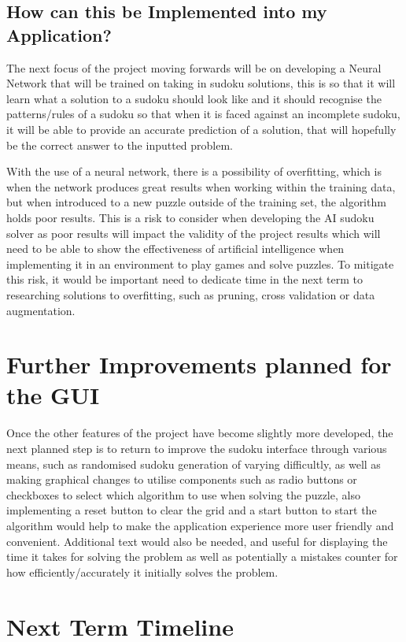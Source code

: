 \documentclass[]{final_report}
\begin{document}
\subsection{How can this be Implemented into my Application?}

The next focus of the project moving forwards will be on developing a Neural Network that will be trained on taking in sudoku solutions, this is so that it will learn what a solution to a sudoku should look like and it should recognise the patterns/rules of a sudoku so that when it is faced against an incomplete sudoku, it will be able to provide an accurate prediction of a solution, that will hopefully be the correct answer to the inputted problem.

With the use of a neural network, there is a possibility of overfitting, which is when the network produces great results when working within the training data, but when introduced to a new puzzle outside of the training set, the algorithm holds poor results. This is a risk to consider when developing the AI sudoku solver as poor results will impact the validity of the project results which will need to be able to show the effectiveness of artificial intelligence when implementing it in an environment to play games and solve puzzles. To mitigate this risk, it would be important need to dedicate time in the next term to researching solutions to overfitting, such as pruning, cross validation or data augmentation. 

\section{Further Improvements planned for the GUI}

Once the other features of the project have become slightly more developed, the next planned step is to return to improve the sudoku interface through various means, such as randomised sudoku generation of varying difficultly, as well as making graphical changes to utilise components such as radio buttons or checkboxes to select which algorithm to use when solving the puzzle, also implementing a reset button to clear the grid and a start button to start the algorithm would help to make the application experience more user friendly and convenient. Additional text would also be needed, and useful for displaying the time it takes for solving the problem as well as potentially a mistakes counter for how efficiently/accurately it initially solves the problem.

\section{Next Term Timeline}
\end{document}

